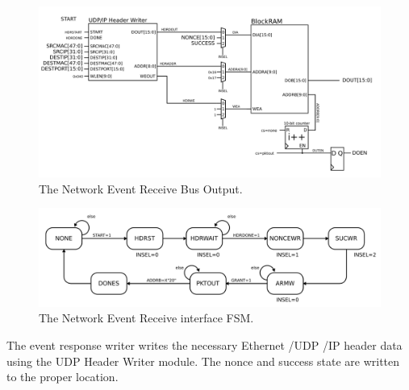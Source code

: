 \begin{figure}
\begin{centering}
\includegraphics[scale=0.8]{eventreceive.responsewriter.svg}
\end{centering}
\caption{The Network Event Receive Bus Output.}
\label{eventreceive.responsewriter}
\end{figure}

\begin{figure}
\begin{centering}
\includegraphics[scale=0.8]{eventreceive.responsewriter.fsm.svg}
\end{centering}
\caption{The Network Event Receive interface FSM.}
\label{eventreceive.responsewriter.fsm}
\end{figure}

The event response writer writes the necessary Ethernet /UDP /IP
header data using the UDP Header Writer module. The nonce and success
state are written to the proper location.

